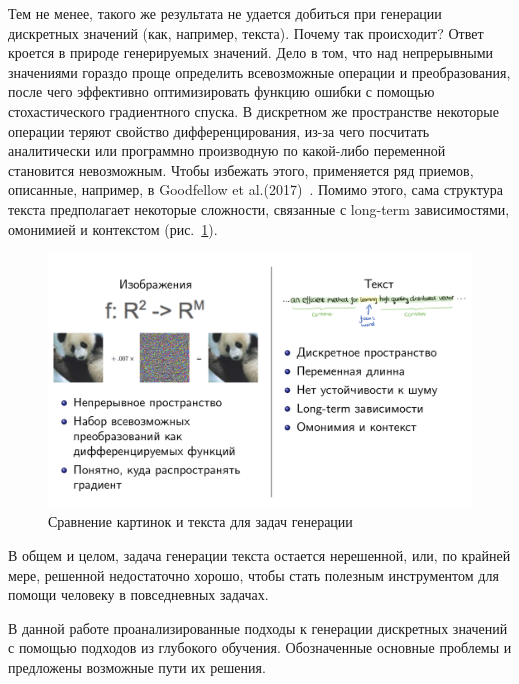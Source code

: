 \documentclass{spbau-diploma}
\begin{document}
Тем не менее, такого же результата не удается добиться при генерации дискретных 
значений (как, например, текста). Почему так происходит? Ответ кроется в природе 
генерируемых значений. Дело в том, что над непрерывными значениями гораздо проще 
определить всевозможные операции и преобразования, после чего эффективно 
оптимизировать функцию ошибки с помощью стохастического градиентного спуска. В 
дискретном же пространстве некоторые операции теряют свойство дифференцирования, 
из-за чего посчитать аналитически или программно производную по какой-либо 
переменной становится невозможным. Чтобы избежать этого, применяется ряд приемов, 
описанные, например, в Goodfellow et al.(2017)~\cite{1701.00160}. Помимо этого, 
сама структура текста предполагает некоторые сложности, связанные с long-term 
зависимостями, омонимией и контекстом (рис.~\ref{pics_vs_text}).

\begin{figure}[h]
\centering
\includegraphics[width=\textwidth]{images/pics_vs_text.png}
\caption{Сравнение картинок и текста для задач генерации}
\label{pics_vs_text}
\end{figure}

В общем и целом, задача генерации текста остается нерешенной, или, по крайней
мере, решенной недостаточно хорошо, чтобы стать полезным инструментом для 
помощи человеку в повседневных задачах.

В данной работе проанализированные подходы к генерации дискретных значений с
помощью подходов из глубокого обучения. Обозначенные основные проблемы и 
предложены возможные пути их решения.
\end{document}
